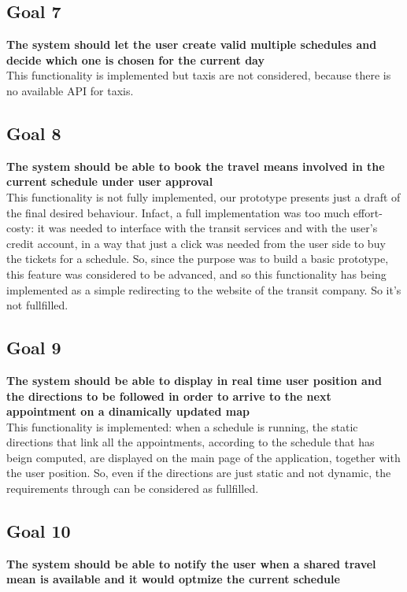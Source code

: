 \subsection{Goal 7} \label{subsect:gScheduleCreation}
\textbf{The system should let the user create valid multiple schedules and decide which one is chosen for the current day}\\

This functionality is implemented but taxis are not considered, because there is no available API for taxis.

\subsection{Goal 8} \label{subsect:gScheduleSelection}
\textbf{The system should be able to book the travel means involved in the current schedule under user approval}\\

This functionality is not fully implemented, our prototype presents just a draft of the final desired behaviour. Infact, a full implementation was too much effort-costy: it was needed to interface with the transit services and with the user's credit account, in a way that just a click was needed from the user side to buy the tickets for a schedule. So, since the purpose was to build a basic prototype, this feature was considered to be advanced, and so this functionality has being implemented as a simple redirecting to the website of the transit company. So  it's not fullfilled.

\subsection{Goal 9} \label{subsect:gDirections}
\textbf{The system should be able to display in real time user position and the directions to be followed in order to arrive to the next appointment on a dinamically updated map}\\

This functionality is implemented: when a schedule is running, the static directions that link all the appointments, according to the schedule that has beign computed, are displayed on the main page of the application, together with the user position. So, even if the directions are just static and not dynamic, the requirements  through  can be considered as fullfilled.

\subsection{Goal 10} \label{subsect:gSharedTMNotifications}
\textbf{The system should be able to notify the user when a shared travel mean is available and it would optmize the current schedule}\\

